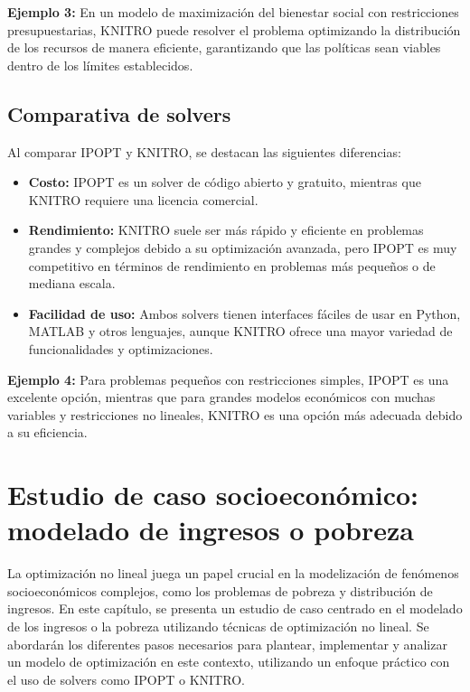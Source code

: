 \begin{flushleft}
	\textbf{Ejemplo 3:} En un modelo de maximización del bienestar social con restricciones presupuestarias, KNITRO puede resolver el problema optimizando la distribución de los recursos de manera eficiente, garantizando que las políticas sean viables dentro de los límites establecidos.
\end{flushleft}

\subsection{Comparativa de solvers}

\begin{flushleft}
	Al comparar IPOPT y KNITRO, se destacan las siguientes diferencias:
\end{flushleft}

\begin{itemize}
	\item \textbf{Costo:} IPOPT es un solver de código abierto y gratuito, mientras que KNITRO requiere una licencia comercial.
	\item \textbf{Rendimiento:} KNITRO suele ser más rápido y eficiente en problemas grandes y complejos debido a su optimización avanzada, pero IPOPT es muy competitivo en términos de rendimiento en problemas más pequeños o de mediana escala.
	\item \textbf{Facilidad de uso:} Ambos solvers tienen interfaces fáciles de usar en Python, MATLAB y otros lenguajes, aunque KNITRO ofrece una mayor variedad de funcionalidades y optimizaciones.
\end{itemize}

\begin{flushleft}
	\textbf{Ejemplo 4:} Para problemas pequeños con restricciones simples, IPOPT es una excelente opción, mientras que para grandes modelos económicos con muchas variables y restricciones no lineales, KNITRO es una opción más adecuada debido a su eficiencia.
\end{flushleft}
\section{Estudio de caso socioeconómico: modelado de ingresos o pobreza}

\begin{flushleft}
	La optimización no lineal juega un papel crucial en la modelización de fenómenos socioeconómicos complejos, como los problemas de pobreza y distribución de ingresos. En este capítulo, se presenta un estudio de caso centrado en el modelado de los ingresos o la pobreza utilizando técnicas de optimización no lineal. Se abordarán los diferentes pasos necesarios para plantear, implementar y analizar un modelo de optimización en este contexto, utilizando un enfoque práctico con el uso de solvers como IPOPT o KNITRO.
\end{flushleft}

